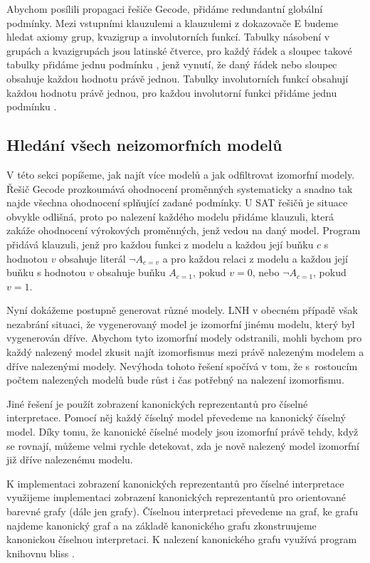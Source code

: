 Abychom posílili propagaci řešiče Gecode, přidáme redundantní
globální pod\-mín\-ky.
Mezi vstupními klauzulemi a klauzulemi z dokazovače E
budeme hledat axiomy grup, kvazigrup a involutorních funkcí.
Tabulky násobení v grupách a kvazigrupách jsou latinské čtverce,
pro každý řádek a sloupec takové tabulky přidáme jednu podmínku
, jenž vynutí, že daný řádek nebo
sloupec obsahuje každou hodnotu právě jednou.
Tabulky involutorních funkcí obsahují každou hodnotu právě jednou,
pro každou involutorní funkci přidáme jednu podmínku
.

\subsection{Hledání všech neizomorfních modelů}

V této sekci popíšeme, jak najít více modelů a jak odfiltrovat
izomorfní modely. Řešič Gecode prozkoumává ohodnocení
proměnných systematicky a snadno tak najde všechna ohodnocení splňující
zadané podmínky. U SAT řešičů je situace obvykle odlišná,
proto po nalezení každého modelu přidáme klauzuli,
která zakáže ohodnocení výrokových proměnných, jenž vedou na daný model.
Program \crossbow{} přidává klauzuli, jenž pro každou
funkci z modelu a každou její buňku $c$ s hodnotou $v$
obsahuje literál $\neg A_{c=v}$ a pro každou relaci z modelu a každou její
buňku s hodnotou $v$ obsahuje buňku $A_{c=1}$, pokud $v = 0$, nebo
$\neg A_{c=1}$, pokud $v = 1$.

Nyní dokážeme postupně generovat různé modely.
LNH v obecném případě však nezabrání situaci,
že vygenerovaný model je izomorfní jinému modelu, který byl
vygenerován dříve.
Abychom tyto izomorfní modely odstranili,
mohli bychom pro každý nalezený model
zkusit najít izomorfismus mezi právě nalezeným modelem
a dříve nalezenými modely.
Nevýhoda tohoto řešení spočívá v tom,
že s~rostoucím počtem nalezených modelů bude růst
i čas potřebný na nalezení izomorfismu.

Jiné řešení je použít zobrazení kanonických reprezentantů pro číselné
interpretace. Pomocí něj každý číselný model převedeme
na kanonický číselný model. Díky tomu, že kanonické číselné modely
jsou izomorfní právě tehdy, když se rovnají, můžeme velmi rychle
detekovat, zda je nově nalezený model izomorfní již
dříve nalezenému modelu.

K implementaci zobrazení kanonických reprezentantů
pro číselné interpretace využijeme implementaci
zobrazení kanonických reprezentantů pro orientované barevné grafy
(dále jen grafy). Číselnou interpretaci převedeme na graf,
ke grafu najdeme kanonický graf a na základě kanonického grafu
zkonstruujeme kanonickou číselnou interpretaci.
K nalezení kanonického grafu využívá program
\crossbow{} knihovnu bliss \cite{bliss}.

